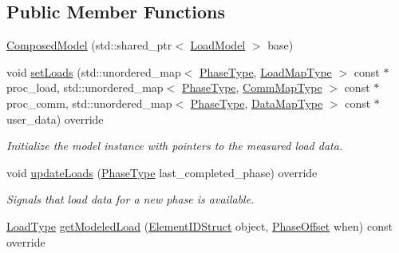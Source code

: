 \subsection*{Public Member Functions}
\begin{DoxyCompactItemize}
\item 
\hyperlink{classvt_1_1vrt_1_1collection_1_1balance_1_1_composed_model_a84b77c1fceb9e07a0706b896a4d9e9c9}{Composed\+Model} (std\+::shared\+\_\+ptr$<$ \hyperlink{structvt_1_1vrt_1_1collection_1_1balance_1_1_load_model}{Load\+Model} $>$ base)
\item 
void \hyperlink{classvt_1_1vrt_1_1collection_1_1balance_1_1_composed_model_a0c4e07b352c1e8cbb8383d26361437e5}{set\+Loads} (std\+::unordered\+\_\+map$<$ \hyperlink{namespacevt_a46ce6733d5cdbd735d561b7b4029f6d7}{Phase\+Type}, \hyperlink{namespacevt_1_1vrt_1_1collection_1_1balance_a5339303db2e1ce964d783a53fd74e6b1}{Load\+Map\+Type} $>$ const $\ast$proc\+\_\+load, std\+::unordered\+\_\+map$<$ \hyperlink{namespacevt_a46ce6733d5cdbd735d561b7b4029f6d7}{Phase\+Type}, \hyperlink{namespacevt_1_1vrt_1_1collection_1_1balance_a01ee1fb0ae2da1d2ab7fdca3be9ae351}{Comm\+Map\+Type} $>$ const $\ast$proc\+\_\+comm, std\+::unordered\+\_\+map$<$ \hyperlink{namespacevt_a46ce6733d5cdbd735d561b7b4029f6d7}{Phase\+Type}, \hyperlink{namespacevt_1_1vrt_1_1collection_1_1balance_acf152c668ed9e2e9c6b29784181d2435}{Data\+Map\+Type} $>$ const $\ast$user\+\_\+data) override
\begin{DoxyCompactList}\small\item\em Initialize the model instance with pointers to the measured load data. \end{DoxyCompactList}\item 
void \hyperlink{classvt_1_1vrt_1_1collection_1_1balance_1_1_composed_model_ad8108b4392d63b7f09e443920a64933a}{update\+Loads} (\hyperlink{namespacevt_a46ce6733d5cdbd735d561b7b4029f6d7}{Phase\+Type} last\+\_\+completed\+\_\+phase) override
\begin{DoxyCompactList}\small\item\em Signals that load data for a new phase is available. \end{DoxyCompactList}\item 
\hyperlink{namespacevt_a8fb51741340b87d7aaee0bef60e9896b}{Load\+Type} \hyperlink{classvt_1_1vrt_1_1collection_1_1balance_1_1_composed_model_a07737f979ebca207a76e6b810c386409}{get\+Modeled\+Load} (\hyperlink{namespacevt_1_1vrt_1_1collection_1_1balance_a9f5b53fafb270212279a4757d2c4cd28}{Element\+I\+D\+Struct} object, \hyperlink{structvt_1_1vrt_1_1collection_1_1balance_1_1_phase_offset}{Phase\+Offset} when) const override

\end{DoxyCompactItemize}
